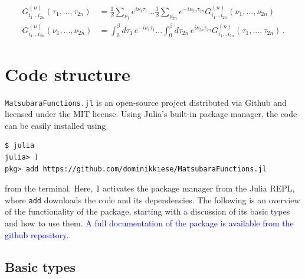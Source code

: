\documentclass{SciPost}
\newcommand{\Gn}[1]{G^{(#1)}}
\begin{document}
%
\begin{linenomath}
    \begin{align}
        \Gn{n}_{i_1 ... i_{2n}}(\tau_1, ..., \tau_{2n}) &= \tfrac{1}{\beta} \sum_{\nu_1} e^{i\nu_1 \tau_1} ... \tfrac{1}{\beta} \sum_{\nu_{2n}} e^{-i \nu_{2n} \tau_{2n}} \Gn{n}_{i_1 ... i_{2n}}(\nu_1, ..., \nu_{2n}) \\
        \Gn{n}_{i_1 ... i_{2n}}(\nu_1, ..., \nu_{2n}) &= \int_{0}^{\beta} d\tau_1\, e^{-i\nu_1 \tau_1} ... \int_{0}^{\beta} d\tau_{2n}\, e^{i \nu_{2n} \tau_{2n}}\Gn{n}_{i_1 ... i_{2n}}(\tau_1, ..., \tau_{2n}) \,.
        \label{eq:gf_ft}
    \end{align}
\end{linenomath}

\section{Code structure}
\label{sec:structure}

\texttt{MatsubaraFunctions.jl} is an open-source project distributed via Github \cite{matsubara_functions} and licensed under the MIT license. Using Julia's built-in package manager, the code can be easily installed using 
%
\begin{verbatim}
$ julia
julia> ]
pkg> add https://github.com/dominikkiese/MatsubaraFunctions.jl
\end{verbatim}
%
from the terminal. Here, \texttt{]} activates the package manager from the Julia REPL, where \texttt{add} downloads the code and its dependencies. The following is an overview of the functionality of the package, starting with a discussion of its basic types and how to use them. \textcolor{blue}{A full documentation of the package is available from the github repository.}

\subsection{Basic types}
\label{subsec:basics}
\end{document}
